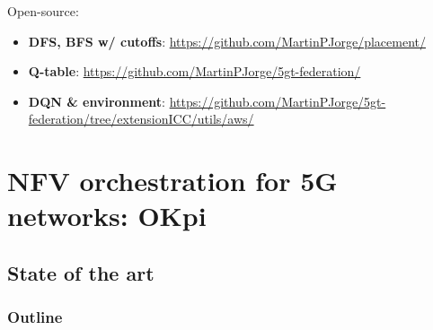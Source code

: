 \documentclass[aspectratio=169]{beamer}
\begin{document}
\begin{frame}
    \frametitle{\secname}
    \framesubtitle{\subsecname}
    Open-source:
    \begin{itemize}
        \item \textbf{DFS, BFS w/ cutoffs}: \url{https://github.com/MartinPJorge/placement/}
        \item \textbf{Q-table}: \url{https://github.com/MartinPJorge/5gt-federation/}
        \item \textbf{DQN \& environment}: \url{https://github.com/MartinPJorge/5gt-federation/tree/extensionICC/utils/aws/}
    \end{itemize}
\end{frame}







\section{NFV orchestration for 5G networks: OKpi}
\subsection{State of the art}
\begin{frame}
    \frametitle{Outline}
    \tableofcontents[subsectionstyle=show/shaded/hide,sectionstyle=show/shaded]
\end{frame}
\end{document}
